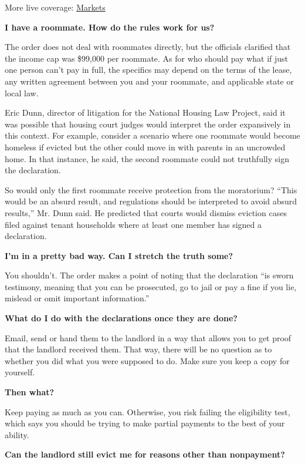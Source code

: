 More live coverage:
\href{https://www.nytimes3xbfgragh.onion/live/2020/09/11/business/stock-market-today-coronavirus?action=click\&pgtype=Article\&state=default\&region=MAIN_CONTENT_1\&context=storylines_live_updates}{Markets}

\textbf{I have a roommate. How do the rules work for us?}

The order does not deal with roommates directly, but the officials
clarified that the income cap was \$99,000 per roommate. As for who
should pay what if just one person can't pay in full, the specifics may
depend on the terms of the lease, any written agreement between you and
your roommate, and applicable state or local law.

Eric Dunn, director of litigation for the National Housing Law Project,
said it was possible that housing court judges would interpret the order
expansively in this context. For example, consider a scenario where one
roommate would become homeless if evicted but the other could move in
with parents in an uncrowded home. In that instance, he said, the second
roommate could not truthfully sign the declaration.

So would only the first roommate receive protection from the moratorium?
``This would be an absurd result, and regulations should be interpreted
to avoid absurd results,'' Mr. Dunn said. He predicted that courts would
dismiss eviction cases filed against tenant households where at least
one member has signed a declaration.

\textbf{I'm in a pretty bad way. Can I stretch the truth some?}

You shouldn't. The order makes a point of noting that the declaration
``is sworn testimony, meaning that you can be prosecuted, go to jail or
pay a fine if you lie, mislead or omit important information.''

\textbf{What do I do with the declarations once they are done?}

Email, send or hand them to the landlord in a way that allows you to get
proof that the landlord received them. That way, there will be no
question as to whether you did what you were supposed to do. Make sure
you keep a copy for yourself.

\textbf{Then what?}

Keep paying as much as you can. Otherwise, you risk failing the
eligibility test, which says you should be trying to make partial
payments to the best of your ability.

\textbf{Can the landlord still evict me for reasons other than
nonpayment?}

